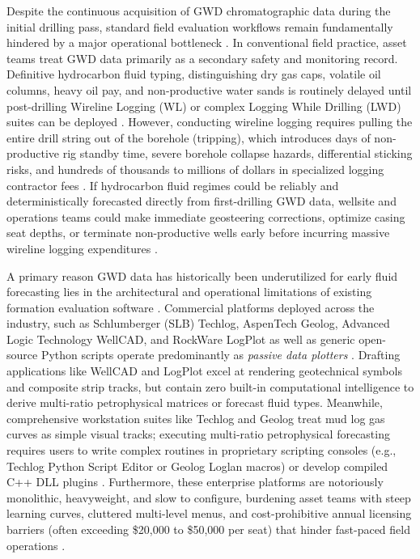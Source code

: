 Despite the continuous acquisition of GWD chromatographic data during the initial drilling pass, standard field evaluation workflows remain fundamentally hindered by a major operational bottleneck \citep{ref9, ref11}. In conventional field practice, asset teams treat GWD data primarily as a secondary safety and monitoring record. Definitive hydrocarbon fluid typing, distinguishing dry gas caps, volatile oil columns, heavy oil pay, and non-productive water sands is routinely delayed until post-drilling Wireline Logging (WL) or complex Logging While Drilling (LWD) suites can be deployed \citep{ref8, ref12}. However, conducting wireline logging requires pulling the entire drill string out of the borehole (tripping), which introduces days of non-productive rig standby time, severe borehole collapse hazards, differential sticking risks, and hundreds of thousands to millions of dollars in specialized logging contractor fees \citep{ref3, ref9}. If hydrocarbon fluid regimes could be reliably and deterministically forecasted directly from first-drilling GWD data, wellsite and operations teams could make immediate geosteering corrections, optimize casing seat depths, or terminate non-productive wells early before incurring massive wireline logging expenditures \citep{ref3, ref8}.

A primary reason GWD data has historically been underutilized for early fluid forecasting lies in the architectural and operational limitations of existing formation evaluation software \citep{ref8, wood2020}. Commercial platforms deployed across the industry, such as Schlumberger (SLB) Techlog, AspenTech Geolog, Advanced Logic Technology WellCAD, and RockWare LogPlot as well as generic open-source Python scripts operate predominantly as \textit{passive data plotters} \citep{wood2020}. Drafting applications like WellCAD and LogPlot excel at rendering geotechnical symbols and composite strip tracks, but contain zero built-in computational intelligence to derive multi-ratio petrophysical matrices or forecast fluid types. Meanwhile, comprehensive workstation suites like Techlog and Geolog treat mud log gas curves as simple visual tracks; executing multi-ratio petrophysical forecasting requires users to write complex routines in proprietary scripting consoles (e.g., Techlog Python Script Editor or Geolog Loglan macros) or develop compiled C++ DLL plugins \citep{wood2020}. Furthermore, these enterprise platforms are notoriously monolithic, heavyweight, and slow to configure, burdening asset teams with steep learning curves, cluttered multi-level menus, and cost-prohibitive annual licensing barriers (often exceeding \$20,000 to \$50,000 per seat) that hinder fast-paced field operations \citep{ref8, wood2020}.

